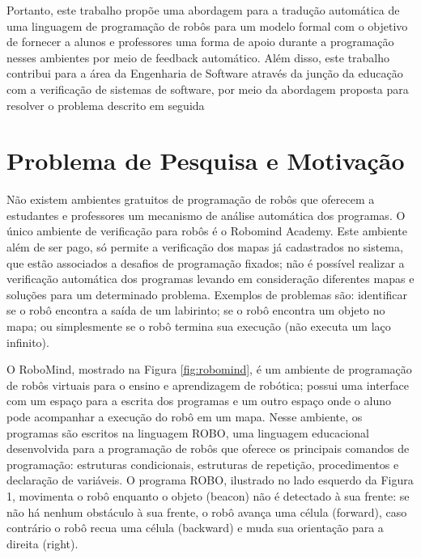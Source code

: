 Portanto, este trabalho propõe uma abordagem para a tradução automática de uma linguagem de programação de robôs para um modelo formal com o objetivo de fornecer a alunos e professores uma forma de apoio durante a programação nesses ambientes por meio de feedback automático. Além disso, este trabalho contribui para a área da Engenharia de Software através da junção da educação com a verificação de sistemas de software, por meio da abordagem proposta para resolver o problema descrito em seguida


\section{Problema de Pesquisa e Motivação}
Não existem ambientes gratuitos de programação de robôs que oferecem a estudantes e professores um mecanismo de análise automática dos programas. O único ambiente de verificação para robôs é o Robomind Academy. Este ambiente além de ser pago, só permite a verificação dos mapas já cadastrados no sistema, que estão associados a desafios de programação fixados; não é possível realizar a verificação automática dos programas levando em consideração diferentes mapas e soluções para um determinado problema. Exemplos de problemas são: identificar se o robô encontra a saída de um labirinto; se o robô encontra um objeto no mapa; ou simplesmente se o robô termina sua execução (não executa um laço infinito).

O RoboMind, mostrado na Figura \ref{fig:robomind}, é um ambiente de programação de robôs virtuais para o ensino e aprendizagem de robótica; possui uma interface com um espaço para a escrita dos programas e um outro espaço onde o aluno pode acompanhar a execução do robô em um mapa. Nesse ambiente, os programas são escritos na linguagem ROBO, uma linguagem educacional desenvolvida para a programação de robôs que oferece os principais comandos de programação: estruturas condicionais, estruturas de repetição, procedimentos e declaração de variáveis. O programa ROBO, ilustrado no lado esquerdo da Figura 1, movimenta o robô enquanto o objeto (beacon) não é detectado à sua frente: se não há nenhum obstáculo à sua frente, o robô avança uma célula (forward), caso contrário o robô recua uma célula (backward) e muda sua orientação para a direita (right).

